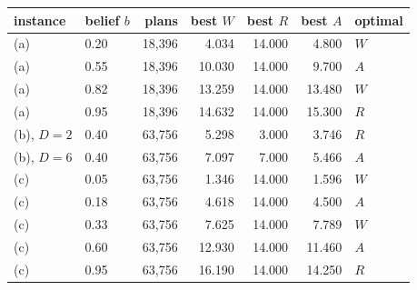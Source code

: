 \begin{tabular}{llrrrrl}
\toprule
instance & belief $b$ & plans & best $W$ & best $R$ & best $A$ & optimal \\
\midrule
(a) & 0.20 & 18{,}396 & 4.034 & 14.000 & 4.800 & $W$ \\
(a) & 0.55 & 18{,}396 & 10.030 & 14.000 & 9.700 & $A$ \\
(a) & 0.82 & 18{,}396 & 13.259 & 14.000 & 13.480 & $W$ \\
(a) & 0.95 & 18{,}396 & 14.632 & 14.000 & 15.300 & $R$ \\
(b), $D=2$ & 0.40 & 63{,}756 & 5.298 & 3.000 & 3.746 & $R$ \\
(b), $D=6$ & 0.40 & 63{,}756 & 7.097 & 7.000 & 5.466 & $A$ \\
(c) & 0.05 & 63{,}756 & 1.346 & 14.000 & 1.596 & $W$ \\
(c) & 0.18 & 63{,}756 & 4.618 & 14.000 & 4.500 & $A$ \\
(c) & 0.33 & 63{,}756 & 7.625 & 14.000 & 7.789 & $W$ \\
(c) & 0.60 & 63{,}756 & 12.930 & 14.000 & 11.460 & $A$ \\
(c) & 0.95 & 63{,}756 & 16.190 & 14.000 & 14.250 & $R$ \\
\bottomrule
\end{tabular}
